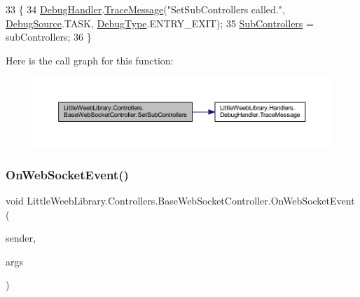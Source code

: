 \begin{DoxyCode}
33         \{
34             \mbox{\hyperlink{class_little_weeb_library_1_1_handlers_1_1_debug_handler}{DebugHandler}}.\mbox{\hyperlink{class_little_weeb_library_1_1_handlers_1_1_debug_handler_afccb37dfd6b2114af72000c2f4fe4607}{TraceMessage}}(\textcolor{stringliteral}{"SetSubControllers called."}, 
      \mbox{\hyperlink{namespace_little_weeb_library_1_1_handlers_a2a6ca0775121c9c503d58aa254d292be}{DebugSource}}.TASK, \mbox{\hyperlink{namespace_little_weeb_library_1_1_handlers_ab66019ed40462876ec4e61bb3ccb0a62}{DebugType}}.ENTRY\_EXIT);
35             \mbox{\hyperlink{class_little_weeb_library_1_1_controllers_1_1_base_web_socket_controller_a73de333945e3c5cbba6976077e62d61c}{SubControllers}} = subControllers;
36         \}
\end{DoxyCode}
Here is the call graph for this function\+:\nopagebreak
\begin{figure}[H]
\begin{center}
\leavevmode
\includegraphics[width=350pt]{class_little_weeb_library_1_1_controllers_1_1_base_web_socket_controller_ae799e6c0e4c3ed0200b18a0360968ac8_cgraph}
\end{center}
\end{figure}
\mbox{\label{class_little_weeb_library_1_1_controllers_1_1_base_web_socket_controller_a5344934da2b25a2ec1599b2ec86dd06e}} 
\subsubsection{\texorpdfstring{On\+Web\+Socket\+Event()}{OnWebSocketEvent()}}
{\footnotesize\ttfamily void Little\+Weeb\+Library.\+Controllers.\+Base\+Web\+Socket\+Controller.\+On\+Web\+Socket\+Event (\begin{DoxyParamCaption}\item[{object}]{sender,  }\item[{\mbox{\hyperlink{class_little_weeb_library_1_1_event_arguments_1_1_web_socket_event_args}{Web\+Socket\+Event\+Args}}}]{args }\end{DoxyParamCaption})\hspace{0.3cm}{\ttfamily [private]}}



